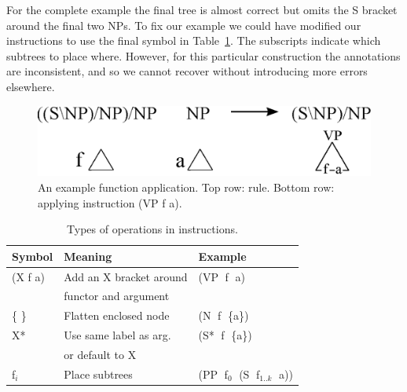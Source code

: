 
For the complete example the final tree is almost correct but omits the S
bracket around the final two NPs.  To fix our example we could have modified
our instructions to use the final symbol in Table~\ref{tab:operators}.  The
subscripts indicate which subtrees to place where.
However, for this particular construction the \ptb annotations are
inconsistent, and so we cannot recover without introducing more errors elsewhere.

\begin{figure}
\begin{center}
\includegraphics[width=0.85\linewidth]{figures/ccg-example}
\end{center}
\caption{\label{fig:inst-example}
An example function application.
Top row: \ccg rule.
Bottom row: applying instruction (VP f a).
}
\end{figure}

\begin{table}
\small
\begin{center}
\renewcommand{\tabcolsep}{1mm}
\begin{tabular}{lll}
	\hline
		Symbol & Meaning & Example \\
	\hline
	\hline
		(X f a) & Add an X bracket around & (VP$\;$ f$\;$ a) \\
		& functor and argument \\
		\{ \} & Flatten enclosed node & (N$\;$ f$\;$ \{a\}) \\
		X* & Use same label as arg. & (S*$\;$ f$\;$ \{a\}) \\
		& or default to X \\
		f$_i$ & Place subtrees &  (PP$\;$ f$_0$$\;$ (S$\;$ f$_{1..k}$$\;$ a)) \\
	\hline
\end{tabular}
\end{center}
\caption{\label{tab:operators}
Types of operations in instructions.
}
\end{table}

